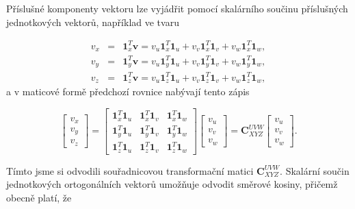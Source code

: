 \documentclass[11pt,a4paper]{article}
\begin{document}
Příslušné komponenty vektoru lze vyjádřit pomocí skalárního součinu příslušných jednotkových vektorů, například ve tvaru

\begin{eqnarray}
v_{x} &=& \mathbf{1}^{T}_{x}\mathbf{v} = v_{u}\mathbf{1}^{T}_{x}\mathbf{1}_{u} + v_{v}\mathbf{1}^{T}_{x}\mathbf{1}_{v} + v_{w}\mathbf{1}^{T}_{x}\mathbf{1}_{w}, \\
v_{y} &=& \mathbf{1}^{T}_{y}\mathbf{v} = v_{u}\mathbf{1}^{T}_{y}\mathbf{1}_{u} + v_{v}\mathbf{1}^{T}_{y}\mathbf{1}_{v} + v_{w}\mathbf{1}^{T}_{y}\mathbf{1}_{w}, \\
v_{z} &=& \mathbf{1}^{T}_{z}\mathbf{v} = v_{u}\mathbf{1}^{T}_{z}\mathbf{1}_{u} + v_{v}\mathbf{1}^{T}_{z}\mathbf{1}_{v} + v_{w}\mathbf{1}^{T}_{z}\mathbf{1}_{w},
\end{eqnarray}
a v maticové formě předchozí rovnice nabývají tento zápis

\begin{equation}
\begin{bmatrix}
v_{x} \\
v_{y} \\
v_{z}
\end{bmatrix} =
\begin{bmatrix}
\mathbf{1}_{x}^{T}\mathbf{1}_{u} & \mathbf{1}_{x}^{T}\mathbf{1}_{v} & \mathbf{1}_{x}^{T}\mathbf{1}_{w} \\
\mathbf{1}_{y}^{T}\mathbf{1}_{u} & \mathbf{1}_{y}^{T}\mathbf{1}_{v} & \mathbf{1}_{y}^{T}\mathbf{1}_{w} \\
\mathbf{1}_{z}^{T}\mathbf{1}_{u} & \mathbf{1}_{z}^{T}\mathbf{1}_{v} & \mathbf{1}_{z}^{T}\mathbf{1}_{w} 
\end{bmatrix} 
\begin{bmatrix}
v_{u} \\
v_{v} \\
v_{w}
\end{bmatrix} = \mathbf{C}^{UVW}_{XYZ}
\begin{bmatrix}
v_{u} \\
v_{v} \\
v_{w}
\end{bmatrix}.
\label{rov:transGeneral}
\end{equation}

Tímto jsme si odvodili souřadnicovou transformační matici $\mathbf{C}_{XYZ}^{UVW}$. Skalární součin jednotkových ortogonálních vektorů umožňuje odvodit směrové kosiny, přičemž obecně platí, že
\end{document}
